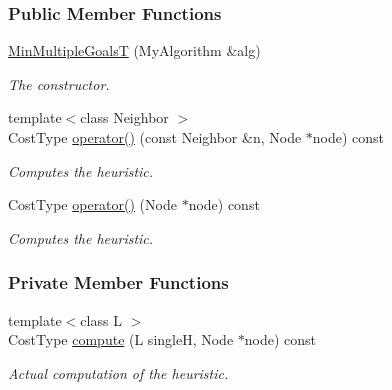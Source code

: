 \subsubsection*{Public Member Functions}
\begin{DoxyCompactItemize}
\item 
\hyperlink{structslb_1_1ext_1_1policy_1_1heuristic_1_1MinMultipleGoalsT_ae1f2259e9e9a4c393f294abca3810e05}{Min\+Multiple\+GoalsT} (My\+Algorithm \&alg)
\begin{DoxyCompactList}\small\item\em The constructor. \end{DoxyCompactList}\item 
{\footnotesize template$<$class Neighbor $>$ }\\Cost\+Type \hyperlink{structslb_1_1ext_1_1policy_1_1heuristic_1_1MinMultipleGoalsT_a5c2095cbab2f64cf53c653d994fd4d05}{operator()} (const Neighbor \&n, Node $\ast$node) const 
\begin{DoxyCompactList}\small\item\em Computes the heuristic. \end{DoxyCompactList}\item 
Cost\+Type \hyperlink{structslb_1_1ext_1_1policy_1_1heuristic_1_1MinMultipleGoalsT_a2850cb27c323600fe586acef9b2f3c76}{operator()} (Node $\ast$node) const 
\begin{DoxyCompactList}\small\item\em Computes the heuristic. \end{DoxyCompactList}\end{DoxyCompactItemize}
\subsubsection*{Private Member Functions}
\begin{DoxyCompactItemize}
\item 
{\footnotesize template$<$class L $>$ }\\Cost\+Type \hyperlink{structslb_1_1ext_1_1policy_1_1heuristic_1_1MinMultipleGoalsT_ac07aaa575e2b7713dc67ab67dc84a54b}{compute} (L singleH, Node $\ast$node) const 
\begin{DoxyCompactList}\small\item\em Actual computation of the heuristic. \end{DoxyCompactList}\end{DoxyCompactItemize}
